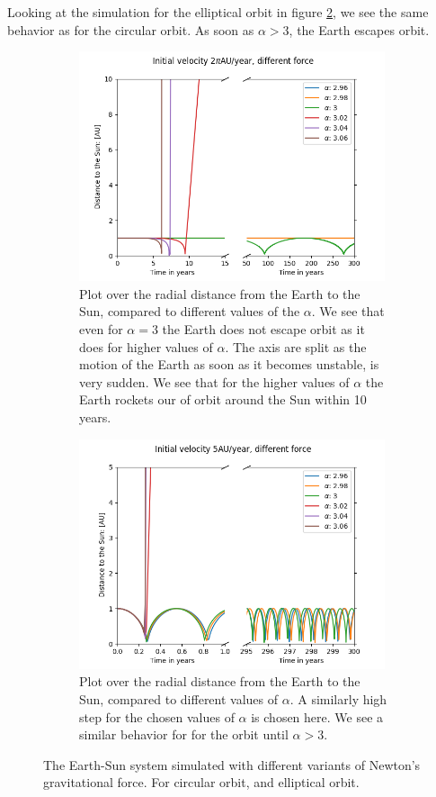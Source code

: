 \documentclass[%
reprint,
nofootinbib,
amsmath,amssymb,
aps,
]{revtex4-1}
\begin{document}
Looking at the simulation for the elliptical orbit in figure \ref{fig:Ea}, we see the same behavior as for the circular orbit. As soon as $\alpha > 3$, the Earth escapes orbit. 
\begin{figure}[t]
	\centering
	\begin{subfigure}{9cm}
		\centering
		\includegraphics[width=9cm]{../code/classes/figure/ForceCirc.png} 
		\caption{Plot over the radial distance from the Earth to the Sun, compared to different values of the $\alpha$. We see that even for $\alpha = 3$ the Earth does not escape orbit as it does for higher values of $\alpha$. The axis are split as the motion of the Earth as soon as it becomes unstable, is very sudden. We see that for the higher values of $\alpha$ the Earth rockets our of orbit around the Sun within 10 years.}
		\label{fig:Ca}
	\end{subfigure}%
	\begin{subfigure}{9cm}
		\centering
		\includegraphics[width=9cm]{../code/classes/figure/ForceElip.png}
		\caption{Plot over the radial distance from the Earth to the Sun, compared to different values of $\alpha$. A similarly high step for the chosen values of $\alpha$ is chosen here. We see a similar behavior for for the orbit until $\alpha > 3$.}
		\label{fig:Ea}
	\end{subfigure}
	\caption{The Earth-Sun system simulated with different variants of Newton's gravitational force. For circular orbit, and elliptical orbit.}
	\label{fig:Force}
\end{figure}
\end{document}
